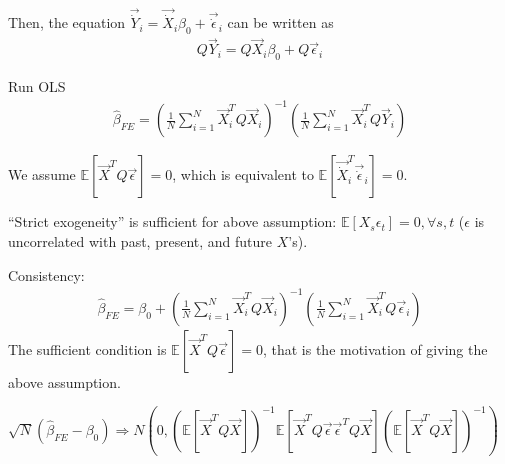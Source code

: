 \documentclass[11pt]{elegantbook}
\begin{document}
Then, the equation $\vec{\dot{Y}}_i=\vec{\dot{X}}_i\beta_0+\vec{\dot{\epsilon}}_i$ can be written as
\begin{equation}
    \begin{aligned}
        Q \vec{Y}_i=Q \vec{X}_i\beta_0+Q \vec{\epsilon}_i
    \end{aligned}
    \nonumber
\end{equation}

Run OLS
\begin{equation}
    \begin{aligned}
        \hat{\beta}_{FE}=\left(\frac{1}{N}\sum_{i=1}^N \vec{X}_i^T Q\vec{X}_i\right)^{-1}\left(\frac{1}{N}\sum_{i=1}^N \vec{X}_i^T Q\vec{Y}_i\right)
    \end{aligned}
    \nonumber
\end{equation}

\begin{assumption}
    We assume $\mathbb{E}[\vec{X}^T Q\vec{\epsilon}]=0$, which is equivalent to $\mathbb{E}[\vec{\dot{X}}_i^T \vec{\dot{\epsilon}}_i]=0$.
\end{assumption}

\begin{note}
    ``Strict exogeneity'' is sufficient for above assumption: $\mathbb{E}[X_{s}\epsilon_{t}]=0, \forall s,t$ ($\epsilon$ is uncorrelated with past, present, and future $X$'s).
\end{note}

Consistency:
\begin{equation}
    \begin{aligned}
        \hat{\beta}_{FE}=\beta_0+\left(\frac{1}{N}\sum_{i=1}^N \vec{X}_i^T Q\vec{X}_i\right)^{-1}\left(\frac{1}{N}\sum_{i=1}^N \vec{X}_i^T Q\vec{\epsilon}_i\right)
    \end{aligned}
    \nonumber
\end{equation}
The sufficient condition is $\mathbb{E}[\vec{X}^TQ\vec{\epsilon}]=0$, that is the motivation of giving the above assumption.
\begin{theorem}
    $\sqrt{N}(\hat{\beta}_{FE}-\beta_0) \Rightarrow N\left(0,(\mathbb{E}[\vec{X}^TQ \vec{X}])^{-1}\mathbb{E}[\vec{X}^T Q \vec{\epsilon}\vec{\epsilon}^T Q \vec{X}](\mathbb{E}[\vec{X}^TQ \vec{X}])^{-1}\right)$
\end{theorem}
\end{document}
